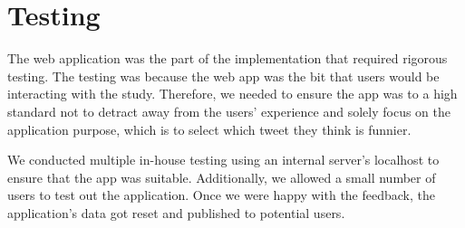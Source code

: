 	\section{Testing}
	
	The web application was the part of the implementation that required rigorous testing. The testing was because the web app was the bit that users would be interacting with the study. Therefore, we needed to ensure the app was to a high standard not to detract away from the users' experience and solely focus on the application purpose, which is to select which tweet they think is funnier. 
	
	We conducted multiple in-house testing using an internal server's localhost to ensure that the app was suitable. Additionally, we allowed a small number of users to test out the application. Once we were happy with the feedback, the application's data got reset and published to potential users.
	
	